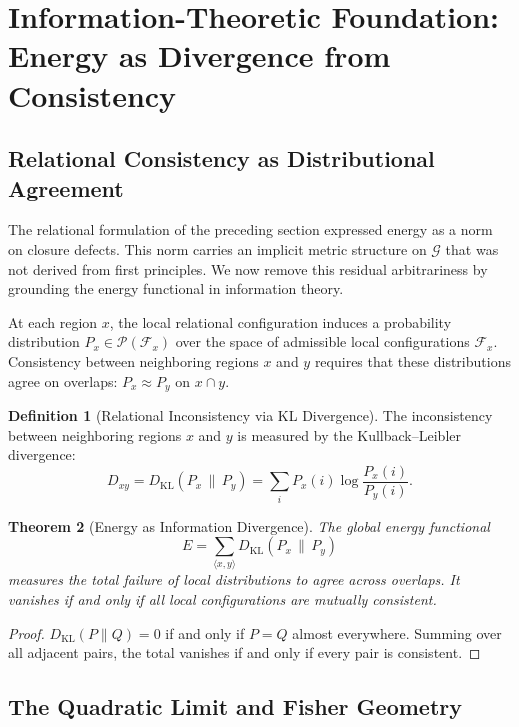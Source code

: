 \documentclass[12pt,a4paper,openany]{book}
\theoremstyle{plain}
\newtheorem{theorem}{Theorem}[chapter]
\theoremstyle{definition}
\newtheorem{definition}[theorem]{Definition}
\theoremstyle{remark}
\begin{document}
\section{Information-Theoretic Foundation: Energy as Divergence from Consistency}
\label{sec:information_foundation}

\subsection{Relational Consistency as Distributional Agreement}

The relational formulation of the preceding section expressed energy as a norm on closure defects. This norm carries an implicit metric structure on $\mathcal{G}$ that was not derived from first principles. We now remove this residual arbitrariness by grounding the energy functional in information theory.

At each region $x$, the local relational configuration induces a probability distribution $P_x \in \mathcal{P}(\mathcal{F}_x)$ over the space of admissible local configurations $\mathcal{F}_x$. Consistency between neighboring regions $x$ and $y$ requires that these distributions agree on overlaps: $P_x \approx P_y$ on $x \cap y$.

\begin{definition}[Relational Inconsistency via KL Divergence]
The inconsistency between neighboring regions $x$ and $y$ is measured by the Kullback--Leibler divergence:
\[
D_{xy} = D_{\mathrm{KL}}(P_x \,\|\, P_y) = \sum_i P_x(i)\log\frac{P_x(i)}{P_y(i)}.
\]
\end{definition}

\begin{theorem}[Energy as Information Divergence]
The global energy functional
\[
E = \sum_{\langle x,y\rangle} D_{\mathrm{KL}}(P_x \,\|\, P_y)
\]
measures the total failure of local distributions to agree across overlaps. It vanishes if and only if all local configurations are mutually consistent.
\end{theorem}

\begin{proof}
$D_{\mathrm{KL}}(P\|Q) = 0$ if and only if $P = Q$ almost everywhere. Summing over all adjacent pairs, the total vanishes if and only if every pair is consistent.
\end{proof}

\subsection{The Quadratic Limit and Fisher Geometry}
\end{document}
